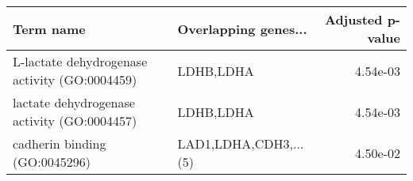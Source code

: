 \begin{tabular}{llr}
\toprule
                                    Term name &  Overlapping genes... &  Adjusted p-value \\
\midrule
L-lactate dehydrogenase activity (GO:0004459) &             LDHB,LDHA &          4.54e-03 \\
  lactate dehydrogenase activity (GO:0004457) &             LDHB,LDHA &          4.54e-03 \\
                cadherin binding (GO:0045296) & LAD1,LDHA,CDH3,...(5) &          4.50e-02 \\
\bottomrule
\end{tabular}
